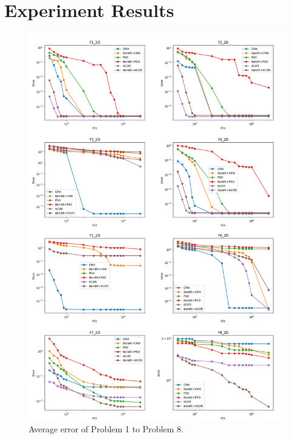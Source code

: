 
\section{Experiment Results}

\begin{figure}
\centering
\includegraphics[width=\textwidth]{Average_F1_F8}
\caption{Average error of Problem 1 to Problem 8.}\label{fig:Average_F1_F8}
\end{figure}

